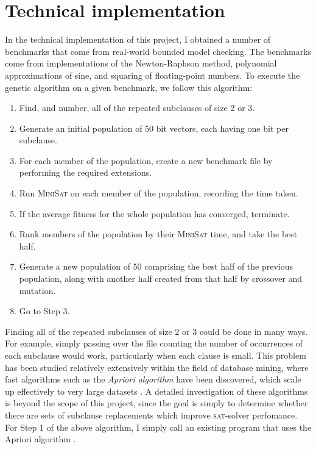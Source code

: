 \documentclass[proof,pdftex,11pt,a4]{article}
\newcommand{\sat}{\textsc{sat}}
\begin{document}

\section{Technical implementation}

In the technical implementation of this project, I obtained a number of benchmarks that come from real-world bounded model checking. The benchmarks come from implementations of the Newton-Raphson method, polynomial approximations of sine, and squaring of floating-point numbers. To execute the genetic algorithm on a given benchmark, we follow this algorithm:

\begin{samepage}
  \begin{enumerate}
    \item Find, and number, all of the repeated subclauses of size 2 or 3.
    \item Generate an initial population of 50 bit vectors, each having one bit per subclause.
    \item For each member of the population, create a new benchmark file by performing the required extensions.
    \item Run \textsc{MiniSat} on each member of the population, recording the time taken.
    \item If the average fitness for the whole population has converged, terminate.
    \item Rank members of the population by their \textsc{MiniSat} time, and take the best half.
    \item Generate a new population of 50 comprising the best half of the previous population, along with another half created from that half by crossover and mutation.
    \item Go to Step 3.
  \end{enumerate}
\end{samepage}

Finding all of the repeated subclauses of size 2 or 3 could be done in many ways. For example, simply passing over the file counting the number of occurrences of each subclause would work, particularly when each clause is small. This problem has been studied relatively extensively within the field of database mining, where fast algorithms such as the \emph{Apriori algorithm} have been discovered, which scale up effectively to very large datasets \cite{Agrawal:1994}. A detailed investigation of these algorithms is beyond the scope of this project, since the goal is simply to determine whether there are sets of subclause replacements which improve \sat{}-solver perfomance. For Step 1 of the above algorithm, I simply call an existing program that uses the Apriori algorithm \cite{Borgelt:2003}.
\end{document}

